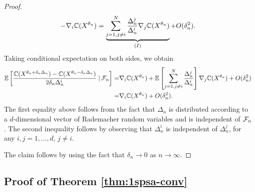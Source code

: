 \begin{proof}
\begin{align*}
- \nabla_i \mathbb{C}(X^{\theta_n})
=\underbrace{\sum_{j=1,j\not=i}^{N} \frac{\Delta_n^j}{\Delta_n^i}\nabla_j \mathbb{C}(X^{\theta_n})}_{(I)} + O(\delta_n^2).
\end{align*}
Taking conditional expectation on both sides, we obtain
\begin{align}
\mathbb{E}\left[\dfrac{\mathbb{C}(X^{\theta_n + \delta_n \Delta_n}) - \mathbb{C}(X^{\theta_n - \delta_n \Delta_n})}{2 \delta_n \Delta_n^i} \left.\right| \mathcal{F}_n\right] 
=& \nabla_i \mathbb{C}(X^{\theta_n}) + \mathbb{E}\left[\sum_{j=1,j\not=i}^{N} \frac{\Delta_n^j}{\Delta_n^i}\right]\nabla_j \mathbb{C}(X^{\theta_n}) + O(\delta_n^2)\nonumber\\
= & \nabla_i \mathbb{C}(X^{\theta_n}) + O(\delta_n^2).\label{eq:l2}
\end{align}
The first equality above follows from the fact that $\Delta_n$ is distributed according to a $d$-dimensional vector of Rademacher random variables and is independent of $\mathcal{F}_n$. The second inequality follows by observing that $\Delta_n^i$ is independent of $\Delta_n^j$, for any $i,j =1,\ldots,d$, $j\ne i$. 

The claim follows by using the fact that $\delta_n \rightarrow 0$ as $n\rightarrow \infty$.
\end{proof}

\subsection*{Proof of Theorem \ref{thm:1spsa-conv}}

